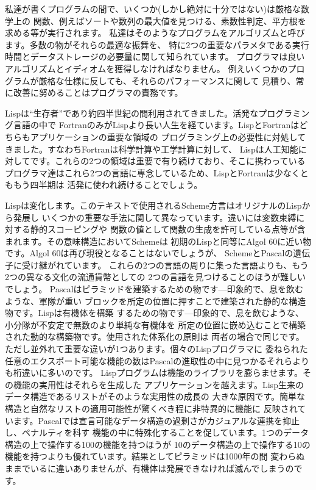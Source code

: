 \documentclass[oneside]{book}
\begin{document}
私達が書くプログラムの間で、いくつか(しかし絶対に十分ではない)は厳格な数学上の
関数、例えばソートや数列の最大値を見つける、素数性判定、平方根を求める等が実行されます。
私達はそのようなプログラムをアルゴリズムと呼びます。多数の物がそれらの最適な振舞を、
特に2つの重要なパラメタである実行時間とデータストレージの必要量に関して知られています。
プログラマは良いアルゴリズムとイディオムを獲得しなければなりません。
例えいくつかのプログラムが厳格な仕様に反しても、それらのパフォーマンスに関して
見積り、常に改善に努めることはプログラマの責務です。


Lispは``生存者''であり約四半世紀の間利用されてきました。活発なプログラミング言語の中で
FortranのみがLispより長い人生を経ています。LispとFortranはどちらもアプリケーションの重要な領域の
プログラミング上の必要性に対処してきました。すなわちFortranは科学計算や工学計算に対して、
Lispは人工知能に対してです。これらの2つの領域は重要で有り続けており、そこに携わっている
プログラマ達はこれら2つの言語に専念しているため、LispとFortranは少なくとももう四半期は
活発に使われ続けることでしょう。


Lispは変化します。このテキストで使用されるScheme方言はオリジナルのLispから発展し
いくつかの重要な手法に関して異なっています。違いには変数束縛に対する静的スコーピングや
関数の値として関数の生成を許可している点等が含まれます。その意味構造においてSchemeは
初期のLispと同等にAlgol 60に近い物です。Algol 60は再び現役となることはないでしょうが、
SchemeとPascalの遺伝子に受け継がれています。
これらの2つの言語の周りに集った言語よりも、もう2つの異なる文化の流通貨幣としての
2つの言語を見つけることのほうが難しいでしょう。
Pascalはピラミッドを建築するための物です---印象的で、息を飲むような、軍隊が重い
ブロックを所定の位置に押すことで建築された静的な構造物です。Lispは有機体を構築
するための物です---印象的で、息を飲むような、小分隊が不安定で無数のより単純な有機体を
所定の位置に嵌め込むことで構築された動的な構築物です。使用された体系化の原則は
両者の場合で同じです。ただし並外れて重要な違いが1つあります。個々のLispプログラマに
委ねられた任意のエクスポート可能な機能の数はPascalの進取性の中に見つかるそれらよりも桁違いに多いのです。
Lispプログラムは機能のライブラリを膨らませます。その機能の実用性はそれらを生成した
アプリケーションを越えます。Lisp生来のデータ構造であるリストがそのような実用性の成長の
大きな原因です。簡単な構造と自然なリストの適用可能性が驚くべき程に非特異的に機能に
反映されています。Pascalでは宣言可能なデータ構造の過剰さがカジュアルな連携を抑止し、ペナルティを科す
機能の中に特殊化することを促しています。1つのデータ構造の上で操作する100の機能を持つほうが
10のデータ構造の上で操作する10の機能を持つよりも優れています。結果としてピラミッドは1000年の間
変わらぬままでいるに違いありませんが、有機体は発展できなければ滅んでしまうのです。
\end{document}
